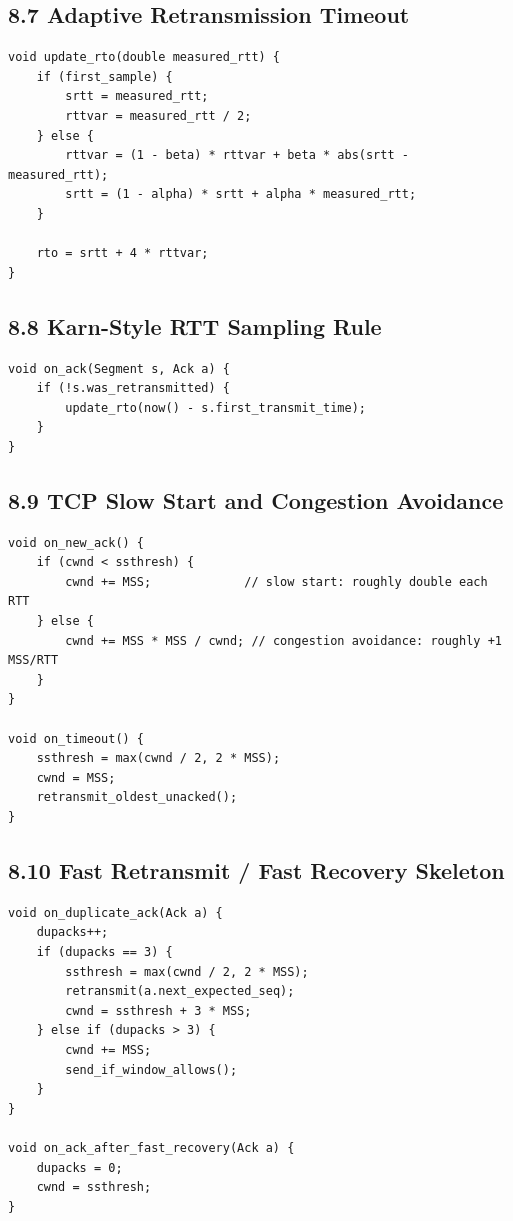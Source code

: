 \documentclass[11pt]{article}
\begin{document}
\subsection{8.7 Adaptive Retransmission
Timeout}\label{adaptive-retransmission-timeout}

\begin{verbatim}
void update_rto(double measured_rtt) {
    if (first_sample) {
        srtt = measured_rtt;
        rttvar = measured_rtt / 2;
    } else {
        rttvar = (1 - beta) * rttvar + beta * abs(srtt - measured_rtt);
        srtt = (1 - alpha) * srtt + alpha * measured_rtt;
    }

    rto = srtt + 4 * rttvar;
}
\end{verbatim}

\subsection{8.8 Karn-Style RTT Sampling
Rule}\label{karn-style-rtt-sampling-rule}

\begin{verbatim}
void on_ack(Segment s, Ack a) {
    if (!s.was_retransmitted) {
        update_rto(now() - s.first_transmit_time);
    }
}
\end{verbatim}

\subsection{8.9 TCP Slow Start and Congestion
Avoidance}\label{tcp-slow-start-and-congestion-avoidance}

\begin{verbatim}
void on_new_ack() {
    if (cwnd < ssthresh) {
        cwnd += MSS;             // slow start: roughly double each RTT
    } else {
        cwnd += MSS * MSS / cwnd; // congestion avoidance: roughly +1 MSS/RTT
    }
}

void on_timeout() {
    ssthresh = max(cwnd / 2, 2 * MSS);
    cwnd = MSS;
    retransmit_oldest_unacked();
}
\end{verbatim}

\subsection{8.10 Fast Retransmit / Fast Recovery
Skeleton}\label{fast-retransmit-fast-recovery-skeleton}

\begin{verbatim}
void on_duplicate_ack(Ack a) {
    dupacks++;
    if (dupacks == 3) {
        ssthresh = max(cwnd / 2, 2 * MSS);
        retransmit(a.next_expected_seq);
        cwnd = ssthresh + 3 * MSS;
    } else if (dupacks > 3) {
        cwnd += MSS;
        send_if_window_allows();
    }
}

void on_ack_after_fast_recovery(Ack a) {
    dupacks = 0;
    cwnd = ssthresh;
}
\end{verbatim}
\end{document}
